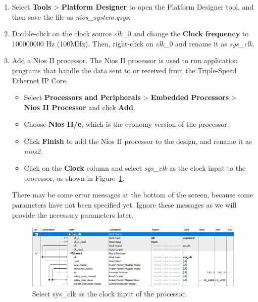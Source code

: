 \documentclass[11pt, twoside, pdftex]{article}
\begin{document}
\begin{enumerate}
	\item Select {\bf Tools} > {\bf Platform Designer} to open the Platform Designer tool, and then save the file as {\it nios\_system.qsys}.

	\item Double-click on the clock source {\it clk\_}0 and change the {\bf Clock frequency} to 100000000 Hz (100MHz). Then, right-click on {\it clk\_}0 and rename it as {\it sys\_clk}. 

	\item Add a Nios II processor. The Nios II processor is used to run application programs that handle the data sent to or received from the Triple-Speed Ethernet IP Core. 
		\begin{itemize}	
			\item Select {\bf Processors and Peripherals} > {\bf Embedded Processors} > {\bf Nios II Processor} and click {\bf Add}.
			\item Choose {\bf Nios II/e}, which is the economy version of the processor. 
			\item Click {\bf Finish} to add the Nios II processor to the design, and rename it as {\it nios2}.
			\item Click on the {\bf Clock} column and select {\it sys\_clk} as the clock input to the processor, as shown in Figure~\ref{fig:processor_clk_select}. 
		\end{itemize}
		There may be some error messages at the bottom of the screen, because some parameters have not been specified yet. Ignore these messages as we will provide the necessary parameters later.

		\begin{figure}[H]
			\centering
			  \includegraphics[scale=0.70]{figures/processor_clk_select.png}
			\caption{Select sys\_clk as the clock input of the processor.} 
			\label{fig:processor_clk_select}
		\end{figure}


\end{enumerate}
\end{document}
